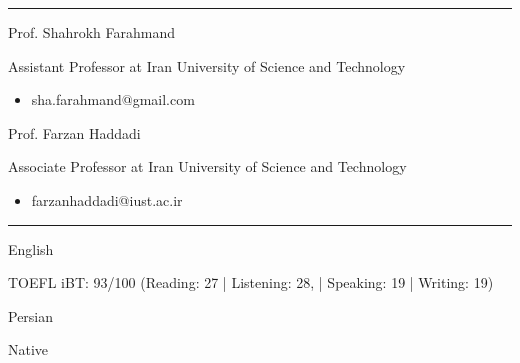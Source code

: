 \documentclass[a4paper,10pt]{article}
\newlength{\cvcolumngapwidth}
\newlength{\cvleftcolumnwidth}
\newlength{\cvrightcolumnwidth}
\newcommand{\cvsectionstyle}[1]{{\normalsize\cvsectionfont\textcolor{cvsectioncolor}{#1}}}
\newcommand{\cvheadingstyle}[1]{{\normalsize\cvheadingfont\textcolor{cvheadingcolor}{#1}}}
\newlength{\cvafteritemskipamount}
\newlength{\cvaftersectionskipamount}
\newlength{\cvbetweensectionandheadingextraskipamount}
\newlength{\cvparskip}
\newcommand{\cvsection}[1]{
    \begin{minipage}[t]{\cvleftcolumnwidth}
        \raggedleft\cvsectionstyle{#1}
    \end{minipage}%
    \hspace{\cvcolumngapwidth}%
    \begin{minipage}[t]{\cvrightcolumnwidth}
        \textcolor{cvrulecolor}{\rule{\cvrightcolumnwidth}{0.3mm}}
    \end{minipage}

    \vspace{\cvaftersectionskipamount}
}
\newcommand{\cvitem}[2]{
    \begin{minipage}[t]{\cvleftcolumnwidth}
        \raggedleft #1
    \end{minipage}%
    \hspace{\cvcolumngapwidth}%
    \begin{minipage}[t]{\cvrightcolumnwidth}
        \setlength{\parskip}{\cvparskip} #2
    \end{minipage}

    \vspace{\cvafteritemskipamount}
}
\begin{document}
\cvsection{Reference}
\vspace{\cvbetweensectionandheadingextraskipamount}
\cvitem{
    \cvheadingstyle{Prof. Shahrokh Farahmand}
}{
    {Assistant Professor at Iran University of Science and Technology}
    \begin{itemize}[leftmargin=*]
        \item sha.farahmand@gmail.com
    \end{itemize}
}
\cvitem{
    \cvheadingstyle{Prof. Farzan Haddadi}
}{
    {Associate Professor at Iran University of Science and Technology}
    \begin{itemize}[leftmargin=*]
        \item farzanhaddadi@iust.ac.ir
    \end{itemize}
}

\cvsection{Language}
\vspace{\cvbetweensectionandheadingextraskipamount}
\cvitem{
    \cvheadingstyle{English}
}{
    {TOEFL iBT: 93/100 (Reading: 27 | Listening: 28, | Speaking: 19 | Writing: 19)}
}
\vspace{-4mm}
\cvitem{
    \cvheadingstyle{Persian}
}{
    Native
}
\end{document}
